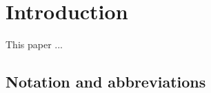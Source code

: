 \section{Introduction}
\label{sec:introduction}
This paper ...

%

\subsection{Notation and abbreviations}
